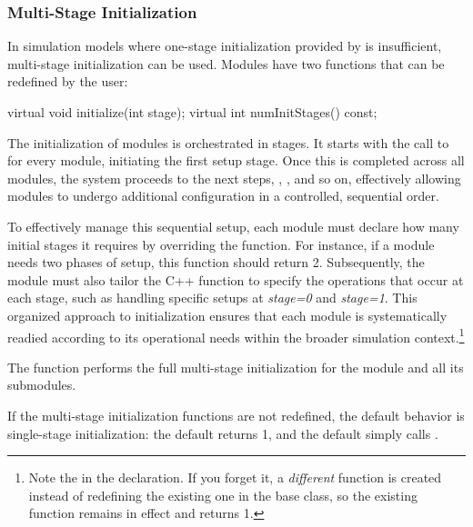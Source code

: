 \subsubsection{Multi-Stage Initialization}
\label{sec:simple-modules:multi-stage-init}

In simulation models where one-stage initialization
provided by  is insufficient, multi-stage
initialization can be used. Modules have two
functions that can be redefined by the user:

\begin{cpp}
virtual void initialize(int stage);
virtual int numInitStages() const;
\end{cpp}

The initialization of modules is orchestrated in stages. It starts with the call
to  for every module, initiating the first setup stage. Once
this is completed across all modules, the system proceeds to the next steps,
, , and so on, effectively allowing
modules to undergo additional configuration in a controlled, sequential order.

To effectively manage this sequential setup, each module must declare how many
initial stages it requires by overriding the  function.
For instance, if a module needs two phases of setup, this function should return
2. Subsequently, the module must also tailor the C++  function to specify the operations that occur at each stage, such as
handling specific setups at \textit{stage=0} and \textit{stage=1}. This
organized approach to initialization ensures that each module is systematically
readied according to its operational needs within the broader simulation
context.\footnote{Note the  in the  declaration.
  If you forget it, a \textit{different} function is created instead of
  redefining the existing one in the base class, so the existing function
  remains in effect and returns 1.}

The  function performs the full multi-stage initialization
for the module and all its submodules.

If the multi-stage initialization functions are not redefined, the
default behavior is single-stage initialization: the default
 returns 1, and the default 
simply calls .


